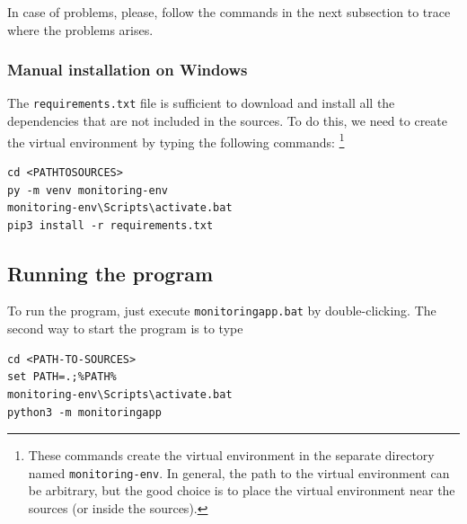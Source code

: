 In case of problems, please, follow the commands in the next subsection to trace where the problems arises.

\subsubsection{Manual installation on Windows}\label{ss:manualInstallationOnWindows}

The \texttt{requirements.txt} file is sufficient to download and install all the dependencies that are not included in the sources. To do this, we need to create the virtual environment by typing the following commands:
\footnote{These commands create the virtual environment in the separate directory named \texttt{monitoring-env}. In general, the path to the virtual environment can be arbitrary, but the good choice is to place the virtual environment near the sources (or inside the sources).}


\begin{verbatim}
cd <PATHTOSOURCES>
py -m venv monitoring-env
monitoring-env\Scripts\activate.bat
pip3 install -r requirements.txt
\end{verbatim}


\subsection{Running the program}
To run the program, just execute \texttt{monitoringapp.bat} by double-clicking. The second way to start the program is to type

\begin{verbatim}
cd <PATH-TO-SOURCES>
set PATH=.;%PATH%
monitoring-env\Scripts\activate.bat
python3 -m monitoringapp
\end{verbatim}








